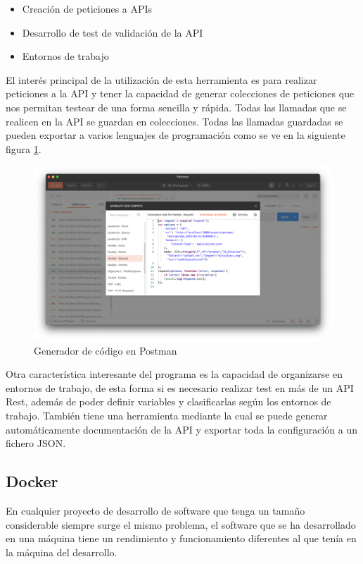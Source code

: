 \begin{itemize}
    \item Creación de peticiones a APIs
    \item Desarrollo de test de validación de la API
    \item Entornos de trabajo
\end{itemize}

El interés principal de la utilización de esta herramienta es para realizar peticiones a la API y tener la capacidad de generar colecciones de peticiones que nos permitan testear de una forma sencilla y rápida.
Todas las llamadas que se realicen en la API se guardan en colecciones. Todas las llamadas guardadas se pueden exportar a varios lenguajes de programación como se ve en la siguiente figura \ref{fig:postman_snippet}.

\begin{figure}[H]
    \centering
    \includegraphics[width=\textwidth]{include/capturas/PostmanSnippet.png}
    \caption{Generador de código en Postman}
    \label{fig:postman_snippet}
\end{figure}

Otra característica interesante del programa es la capacidad de organizarse en entornos de trabajo, de esta forma si es necesario realizar test en más de un API Rest, además de poder definir variables y clasificarlas según los entornos de trabajo. También tiene una herramienta mediante la cual se puede generar automáticamente documentación de la API y exportar toda la configuración a un fichero JSON.


\subsection{Docker}

En cualquier proyecto de desarrollo de software que tenga un tamaño considerable siempre surge el mismo problema, el software que se ha desarrollado en una máquina tiene un rendimiento y funcionamiento diferentes al que tenía en la máquina del desarrollo.


